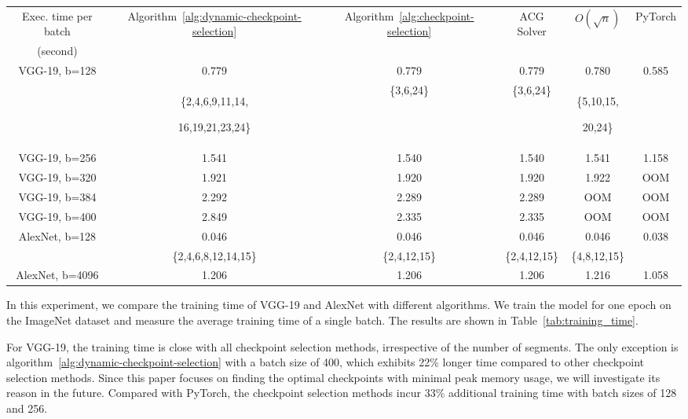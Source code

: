 \begin{table*}[h!tb]
\centering
\caption{The Training Time of One Batch Using Different Methods}
\label{tab:training_time}
\footnotesize
\begin{tabular}{|c|c|c|c|c|c|}
    \hline
    Exec. time per batch & Algorithm~\ref{alg:dynamic-checkpoint-selection} & Algorithm~\ref{alg:checkpoint-selection} & ACG Solver & $O(\sqrt{n})$ & PyTorch \\
     (second) & & & & & \\
    \hline
    \hline
    VGG-19, b=128 & 0.779 & 0.779 & 0.779 & 0.780 & 0.585 \\
    & {\{2,4,6,9,11,14,\par 16,19,21,23,24\}} & \{3,6,24\} & \{3,6,24\} & {\{5,10,15,\par 20,24\}} & \\
    \hline
    VGG-19, b=256 & 1.541 & 1.540 & 1.540 & 1.541 & 1.158 \\
    \hline
    VGG-19, b=320 & 1.921 & 1.920 & 1.920 & 1.922 & OOM \\
    \hline
    VGG-19, b=384 & 2.292 & 2.289 & 2.289 & OOM & OOM \\
    \hline
    VGG-19, b=400 & 2.849 & 2.335 & 2.335 & OOM & OOM \\
    \hline
    \hline
    AlexNet, b=128 & 0.046 & 0.046 & 0.046 & 0.046 & 0.038 \\
    & \{2,4,6,8,12,14,15\} & \{2,4,12,15\} & \{2,4,12,15\} & \{4,8,12,15\} & \\
    \hline
    AlexNet, b=4096 & 1.206 & 1.206 & 1.206 & 1.216 & 1.058 \\
    \hline
\end{tabular}
\end{table*}

In this experiment, we compare the training time of VGG-19 and AlexNet with different algorithms.
We train the model for one epoch on the ImageNet dataset and measure the average training time of a single batch.
The results are shown in Table~\ref{tab:training_time}.

For VGG-19, the training time is close with all checkpoint selection methods, irrespective of the number of segments.
The only exception is algorithm~\ref{alg:dynamic-checkpoint-selection} with a batch size of 400, which exhibits 22\% longer time compared to other checkpoint selection methods.
Since this paper focuses on finding the optimal checkpoints with minimal peak memory usage, we will investigate its reason in the future.
Compared with PyTorch, the checkpoint selection methods incur 33\% additional training time with batch sizes of 128 and 256.

